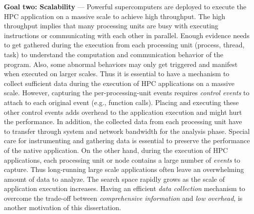 \par{ \textbf{Goal two: Scalability} ---
Powerful supercomputers are deployed to execute the HPC application on a massive scale to achieve high throughput.
%
The high throughput implies that many processing units are busy with executing instructions or communicating with each other in parallel.
%
Enough evidence needs to get gathered during the execution from each processing unit (process, thread, task) to understand the computation and communication behavior of the program.
%
Also, some abnormal behaviors may only get triggered and manifest when executed on larger scales.
%
Thus it is essential to have a mechanism to collect sufficient data during the execution of HPC applications on a massive scale.
%
However, capturing the per-processing-unit events requires \textit{control events} to attach to each original event (e.g., function calls).
%
Placing and executing these other control events adds overhead to the application execution and might hurt the performance.
%
In addition, the collected data from each processing unit have to transfer through system and network bandwidth for the analysis phase.
%
Special care for instrumenting and gathering data is essential to preserve the performance of the native application.
%
On the other hand, during the execution of HPC applications, each processing unit or node contains a large number of \textit{events} to capture.
%
Thus long-running large scale applications often leave an overwhelming amount of data to analyze.
%
The search space rapidly grows as the scale of application execution increases.
%
Having an efficient \textit{data collection} mechanism to overcome the trade-off between \textit{comprehensive information} and \textit{low overhead}, is another motivation of this dissertation.
%
}

